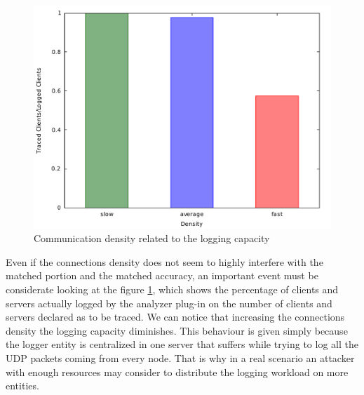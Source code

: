 \begin{figure}
	\centering
	\includegraphics[scale=0.35]{graphs/density_clients_ration.pdf}
	\caption{Communication density related to the logging capacity}
	\label{fig:g_density}
\end{figure}

Even if the connections density does not seem to highly interfere with
the matched portion and the matched accuracy, an important event must be
considerate looking at the figure \ref{fig:g_density}, which shows the
percentage of clients and servers actually logged by the analyzer plug-in on the                %
number of clients and servers declared as to be traced. We can notice
that increasing the connections density the logging capacity diminishes.
This behaviour is given simply because the logger entity is centralized                         %
in one server that suffers while trying to log all the UDP packets
coming from every node. That is why in a real
scenario an attacker with enough resources may consider to distribute 
the logging workload on more
entities.

